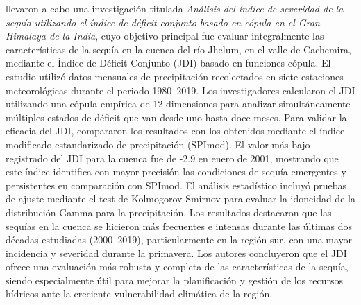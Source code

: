 \textcite{Parvaze2025} llevaron a cabo una investigación titulada \emph{Análisis del índice de severidad de la sequía utilizando el índice de déficit conjunto basado en cópula en el Gran Himalaya de la India}, cuyo objetivo principal fue evaluar integralmente las características de la sequía en la cuenca del río Jhelum, en el valle de Cachemira, mediante el Índice de Déficit Conjunto (JDI) basado en funciones cópula. El estudio utilizó datos mensuales de precipitación recolectados en siete estaciones meteorológicas durante el periodo 1980--2019. Los investigadores calcularon el JDI utilizando una cópula empírica de 12 dimensiones para analizar simultáneamente múltiples estados de déficit que van desde uno hasta doce meses. Para validar la eficacia del JDI, compararon los resultados con los obtenidos mediante el índice modificado estandarizado de precipitación (SPImod). El valor más bajo registrado del JDI para la cuenca fue de -2.9 en enero de 2001, mostrando que este índice identifica con mayor precisión las condiciones de sequía emergentes y persistentes en comparación con SPImod. El análisis estadístico incluyó pruebas de ajuste mediante el test de Kolmogorov-Smirnov para evaluar la idoneidad de la distribución Gamma para la precipitación. Los resultados destacaron que las sequías en la cuenca se hicieron más frecuentes e intensas durante las últimas dos décadas estudiadas (2000--2019), particularmente en la región sur, con una mayor incidencia y severidad durante la primavera. Los autores concluyeron que el JDI ofrece una evaluación más robusta y completa de las características de la sequía, siendo especialmente útil para mejorar la planificación y gestión de los recursos hídricos ante la creciente vulnerabilidad climática de la región.

